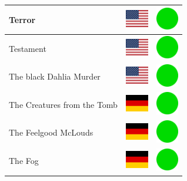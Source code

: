 \documentclass[12pt, a4paper, twoside]{report}
\begin{document}
\begin{center}
\begin{longtable}{|p{5cm}|p{2cm}|p{2cm}|}
			Terror & \includegraphics[width=1cm]{4x3/us} & \includegraphics[width=1cm]{likes/y} \\ \hline
			Testament & \includegraphics[width=1cm]{4x3/us} & \includegraphics[width=1cm]{likes/y} \\ \hline
			The black Dahlia Murder & \includegraphics[width=1cm]{4x3/us} & \includegraphics[width=1cm]{likes/y} \\ \hline
			The Creatures from the Tomb & \includegraphics[width=1cm]{4x3/de} & \includegraphics[width=1cm]{likes/y} \\ \hline
			The Feelgood McLouds & \includegraphics[width=1cm]{4x3/de} & \includegraphics[width=1cm]{likes/y} \\ \hline
			The Fog & \includegraphics[width=1cm]{4x3/de} & \includegraphics[width=1cm]{likes/y} \\ \hline

\end{longtable}
\end{center}
\end{document}

